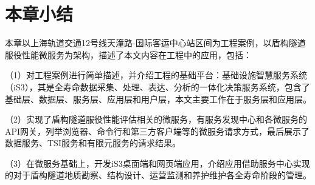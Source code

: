 \section{本章小结}

本章以上海轨道交通12号线天潼路-国际客运中心站区间为工程案例，以盾构隧道服役性能微服务为架构，描述了本文内容在工程中的应用，包括：

（1）对工程案例进行简单描述，并介绍工程的基础平台：基础设施智慧服务系统（iS3），其是全寿命数据采集、处理、表达、分析的一体化决策服务系统，包含了基础层、数据层、服务层、应用层和用户层，本文主要工作在于服务层和应用层。

（2）实现了盾构隧道服役性能评估相关的微服务，有服务发现中心和各微服务的API网关，列举浏览器、命令行和第三方客户端等的微服务请求方式，最后展示了数据服务、TSI服务和有限元服务的请求结果。

（3）在微服务基础上，开发iS3桌面端和网页端应用，介绍应用借助服务中心实现的对于盾构隧道地质勘察、结构设计、运营监测和养护维护各全寿命阶段的管理。